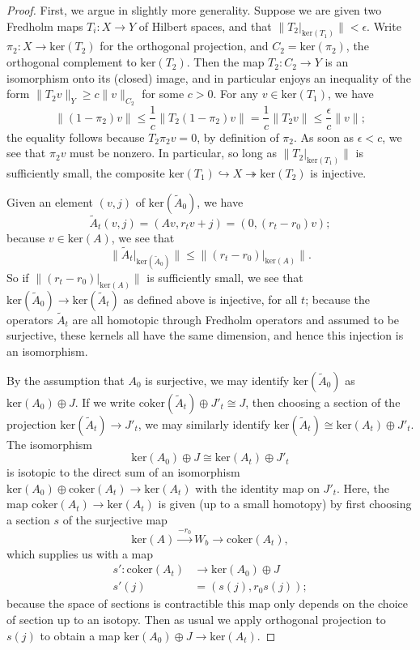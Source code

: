 \documentclass[10pt,a4paper]{amsart}
\theoremstyle{definition}
\theoremstyle{remark}
\numberwithin{figure}{qchap}
\begin{document}
\begin{proof}First, we argue in slightly more generality. Suppose we are given two Fredholm maps $T_i: X \to Y$ of Hilbert spaces, and that $\|T_2\big|_{\text{ker}(T_1)}\| < \epsilon$. Write $\pi_2: X \to \text{ker}(T_2)$ for the orthogonal projection, and $C_2 = \text{ker}(\pi_2)$, the orthogonal complement to $\text{ker}(T_2)$. Then the map $T_2: C_2 \to Y$ is an isomorphism onto its (closed) image, and in particular enjoys an inequality of the form $\|T_2 v\|_Y \geq c\|v\|_{C_2}$ for some $c > 0$. For any $v \in \text{ker}(T_1)$, we have $$\|(1-\pi_2)v\| \leq \frac 1c \|T_2 (1-\pi_2)v\| = \frac 1c \|T_2 v\|\leq \frac{\epsilon}{c} \|v\|;$$ the equality follows because $T_2 \pi_2 v = 0$, by definition of $\pi_2$. As soon as $\epsilon < c$, we see that $\pi_2 v$ must be nonzero. In particular, so long as $\|T_2\big|_{\text{ker}(T_1)}\|$ is sufficiently small, the composite $\text{ker}(T_1) \hookrightarrow X \twoheadrightarrow \text{ker}(T_2)$ is injective.

Given an element $(v, j)$ of $\text{ker}(\widetilde A_0)$, we have $$\widetilde A_t(v,j) = (Av, r_t v + j) = (0, (r_t - r_0) v);$$ because $v \in \text{ker}(A)$, we see that $$\|\widetilde A_t\big|_{\text{ker}(\widetilde A_0)} \| \leq \|(r_t - r_0)\big|_{\text{ker}(A)}\|.$$ So if $\|(r_t - r_0)\big|_{\text{ker}(A)}\|$ is sufficiently small, we see that $\text{ker}(\widetilde A_0) \to \text{ker}(\widetilde A_t)$ as defined above is injective, for all $t$; because the operators $\widetilde A_t$ are all homotopic through Fredholm operators and assumed to be surjective, these kernels all have the same dimension, and hence this injection is an isomorphism.

By the assumption that $A_0$ is surjective, we may identify $\text{ker}(\widetilde A_0)$ as $\text{ker}(A_0) \oplus J$. If we write $\text{coker}(\widetilde A_t) \oplus J'_t \cong J$, then choosing a section of the projection $\text{ker}(\widetilde A_t) \to J'_t$, we may similarly identify $\text{ker}(\widetilde A_t) \cong \text{ker}(A_t) \oplus J'_t$. The isomorphism $$\text{ker}(A_0) \oplus J \cong \text{ker}(A_t) \oplus J'_t$$ is isotopic to the direct sum of an isomorphism $\text{ker}(A_0) \oplus \text{coker}(A_t) \to \text{ker}(A_t)$ with the identity map on $J'_t$. Here, the map $\text{coker}(A_t) \to \text{ker}(A_t)$ is given (up to a small homotopy) by first choosing a section $s$ of the surjective map 
$$\text{ker}(A) \xrightarrow{-r_0} W_b \to \text{coker}(A_t),$$ 
which supplies us with a map 
\begin{align*}s': \text{coker}(A_t) &\to \text{ker}(A_0) \oplus J\\ 
s'(j) &= (s(j), r_0 s(j));\end{align*}
because the space of sections is contractible this map only depends on the choice of section up to an isotopy. Then as usual we apply orthogonal projection to $s(j)$ to obtain a map $\text{ker}(A_0) \oplus J \to \text{ker}(A_t)$.


\end{proof}
\end{document}
